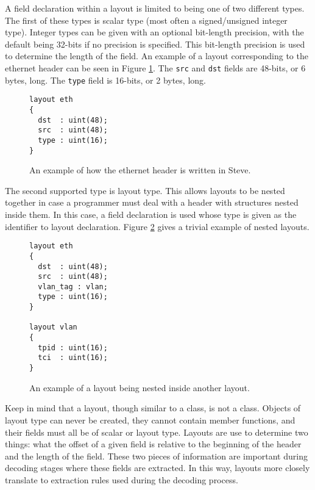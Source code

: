 A field declaration within a layout is limited to being one of two different types. The first of these types is scalar type (most often a signed/unsigned integer type). Integer types can be given with an optional bit-length precision, with the default being 32-bits if no precision is specified. This bit-length precision is used to determine the length of the field. An example of a layout corresponding to the ethernet header \cite{eth_std} can be seen in Figure \ref{fg:ethernet_layout_ex}. The \texttt{src} and \texttt{dst} fields are 48-bits, or 6 bytes, long. The \texttt{type} field is 16-bits, or 2 bytes, long.

\begin{figure}
\begin{lstlisting}
layout eth
{
  dst  : uint(48);
  src  : uint(48);
  type : uint(16);
}
\end{lstlisting}
\caption{An example of how the ethernet header is written in Steve.}
\label{fg:ethernet_layout_ex}
\end{figure}

The second supported type is layout type. This allows layouts to be nested together in case a programmer must deal with a header with structures nested inside them. In this case, a field declaration is used whose type is given as the identifier to layout declaration. Figure \ref{fg:nested_layout_ex} gives a trivial example of nested layouts.

\begin{figure}
\begin{lstlisting}
layout eth
{
  dst  : uint(48);
  src  : uint(48);
  vlan_tag : vlan;
  type : uint(16);
}

layout vlan
{
  tpid : uint(16);
  tci  : uint(16);
}
\end{lstlisting}
\caption{An example of a layout being nested inside another layout.}
\label{fg:nested_layout_ex}
\end{figure}

Keep in mind that a layout, though similar to a class, is not a class. Objects of layout type can never be created, they cannot contain member functions, and their fields must all be of scalar or layout type. Layouts are use to determine two things: what the offset of a given field is relative to the beginning of the header and the length of the field. These two pieces of information are important during decoding stages where these fields are extracted. In this way, layouts more closely translate to extraction rules used during the decoding process. 

